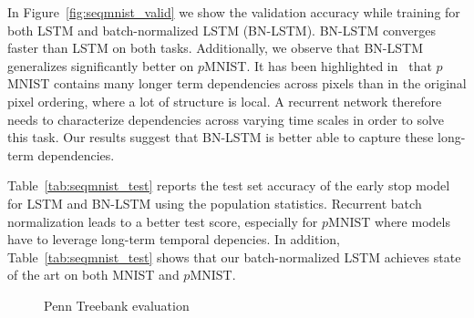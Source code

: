 \documentclass{article} %
\begin{document}
In Figure~\ref{fig:seqmnist_valid} we show the validation accuracy while
training for both LSTM and batch-normalized LSTM (BN-LSTM).  BN-LSTM converges
faster than LSTM on both tasks.  Additionally, we observe that BN-LSTM
generalizes significantly better on $p$MNIST.  It has been highlighted
in~\cite{urnn} that $p$MNIST contains many longer term dependencies across
pixels than in the original pixel ordering, where a lot of structure is local.
A recurrent network therefore needs to characterize dependencies across varying
time scales in order to solve this task.  Our results suggest that BN-LSTM is
better able to capture these long-term dependencies.

Table~\ref{tab:seqmnist_test} reports the test set accuracy of the early stop
model for LSTM and BN-LSTM using the population statistics.  Recurrent batch
normalization leads to a better test score, especially for $p$MNIST where
models have to leverage long-term temporal depencies.  In addition,
Table~\ref{tab:seqmnist_test} shows that our batch-normalized LSTM achieves
state of the art on both MNIST and $p$MNIST.

\begin{figure}[!ht]
  \center%
  \hspace{2mm}%
  \caption{Penn Treebank evaluation}
  \label{fig:ptb}
\end{figure}
\end{document}
